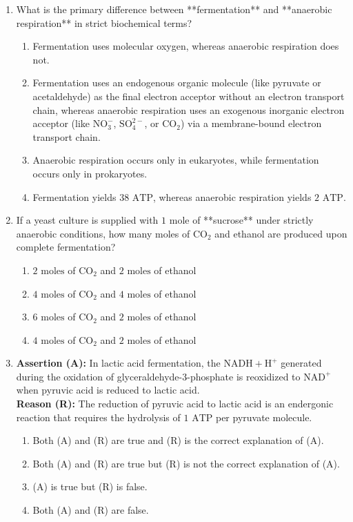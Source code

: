 \documentclass[11pt, a4paper]{article}
\begin{document}
\begin{enumerate}[label=\textbf{\arabic*.}]
\item What is the primary difference between **fermentation** and **anaerobic respiration** in strict biochemical terms?
\begin{enumerate}[label=(\Alph*)]
    \item Fermentation uses molecular oxygen, whereas anaerobic respiration does not.
    \item Fermentation uses an endogenous organic molecule (like pyruvate or acetaldehyde) as the final electron acceptor without an electron transport chain, whereas anaerobic respiration uses an exogenous inorganic electron acceptor (like $\text{NO}_3^-$, $\text{SO}_4^{2-}$, or $\text{CO}_2$) via a membrane-bound electron transport chain.
    \item Anaerobic respiration occurs only in eukaryotes, while fermentation occurs only in prokaryotes.
    \item Fermentation yields $38\text{ ATP}$, whereas anaerobic respiration yields $2\text{ ATP}$.
\end{enumerate}

\item If a yeast culture is supplied with $1\text{ mole}$ of **sucrose** under strictly anaerobic conditions, how many moles of $\text{CO}_2$ and ethanol are produced upon complete fermentation?
\begin{enumerate}[label=(\Alph*)]
    \item $2\text{ moles}$ of $\text{CO}_2$ and $2\text{ moles}$ of ethanol
    \item $4\text{ moles}$ of $\text{CO}_2$ and $4\text{ moles}$ of ethanol
    \item $6\text{ moles}$ of $\text{CO}_2$ and $2\text{ moles}$ of ethanol
    \item $4\text{ moles}$ of $\text{CO}_2$ and $2\text{ moles}$ of ethanol
\end{enumerate}

\item \textbf{Assertion (A):} In lactic acid fermentation, the $\text{NADH} + \text{H}^+$ generated during the oxidation of glyceraldehyde-3-phosphate is reoxidized to $\text{NAD}^+$ when pyruvic acid is reduced to lactic acid. \\
\textbf{Reason (R):} The reduction of pyruvic acid to lactic acid is an endergonic reaction that requires the hydrolysis of $1\text{ ATP}$ per pyruvate molecule.
\begin{enumerate}[label=(\Alph*)]
    \item Both (A) and (R) are true and (R) is the correct explanation of (A).
    \item Both (A) and (R) are true but (R) is not the correct explanation of (A).
    \item (A) is true but (R) is false.
    \item Both (A) and (R) are false.
\end{enumerate}


\end{enumerate}
\end{document}
